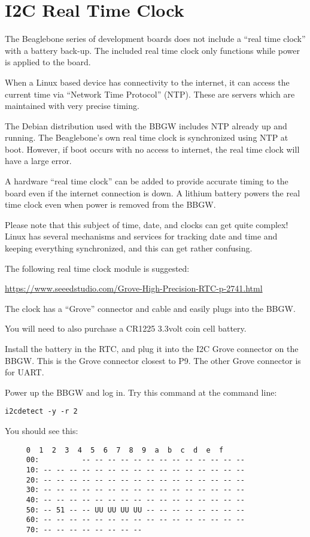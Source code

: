 \chapter{I2C Real Time Clock}

The Beaglebone series of development boards does not include a ``real time clock'' with a battery back-up.  The included real time clock only functions while power is applied to the board.

When a Linux based device has connectivity to the internet, it can access the current time via ``Network Time Protocol'' (NTP).  These are servers which are maintained with very precise timing.

The Debian distribution used with the BBGW includes NTP already up and running.  The Beaglebone's own real time clock is synchronized using NTP at boot.  However, if boot occurs with no access to internet, the real time clock will have a large error.

A hardware ``real time clock'' can be added to provide accurate timing to the board even if the internet connection is down.  A lithium battery powers the real time clock even when power is removed from the BBGW.

Please note that this subject of time, date, and clocks can get quite complex!  Linux has several mechanisms and services for tracking date and time and keeping everything synchronized, and this can get rather confusing.

The following real time clock module is suggested:

\url{https://www.seeedstudio.com/Grove-High-Precision-RTC-p-2741.html}

The clock has a ``Grove'' connector and cable and easily plugs into the BBGW.

You will need to also purchase a CR1225 3.3volt coin cell battery.

Install the battery in the RTC, and plug it into the I2C Grove connector on the BBGW.  This is the Grove connector closest to P9.  The other Grove connector is for UART.

Power up the BBGW and log in.  Try this command at the command line:

\begin{verbatim}
i2cdetect -y -r 2
\end{verbatim}

You should see this:

\begin{verbatim}
     0  1  2  3  4  5  6  7  8  9  a  b  c  d  e  f
     00:          -- -- -- -- -- -- -- -- -- -- -- -- -- 
     10: -- -- -- -- -- -- -- -- -- -- -- -- -- -- -- -- 
     20: -- -- -- -- -- -- -- -- -- -- -- -- -- -- -- -- 
     30: -- -- -- -- -- -- -- -- -- -- -- -- -- -- -- -- 
     40: -- -- -- -- -- -- -- -- -- -- -- -- -- -- -- -- 
     50: -- 51 -- -- UU UU UU UU -- -- -- -- -- -- -- -- 
     60: -- -- -- -- -- -- -- -- -- -- -- -- -- -- -- -- 
     70: -- -- -- -- -- -- -- --
\end{verbatim}

